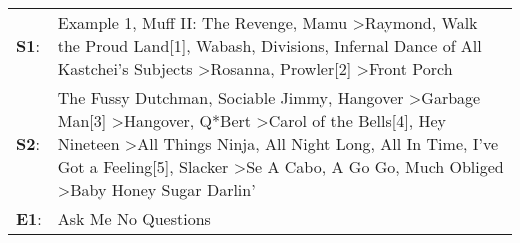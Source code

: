 \begin{supertabular}{p{0.03\textwidth}p{0.92\textwidth}}
 \textbf{S1}:  &                                                                                                                                                                                                                                                                                                Example 1\textsuperscript{}, \enspace Muff II: The Revenge\textsuperscript{}, \enspace Mamu\textsuperscript{} \textgreater \enspace Raymond\textsuperscript{}, \enspace Walk the Proud Land[1]\textsuperscript{}, \enspace Wabash\textsuperscript{}, \enspace Divisions\textsuperscript{}, \enspace Infernal Dance of All Kastchei's Subjects\textsuperscript{} \textgreater \enspace Rosanna\textsuperscript{}, \enspace Prowler[2]\textsuperscript{} \textgreater \enspace Front Porch\textsuperscript{}  \enspace  \\
 \textbf{S2}:  &  The Fussy Dutchman\textsuperscript{}, \enspace Sociable Jimmy\textsuperscript{}, \enspace Hangover\textsuperscript{} \textgreater \enspace Garbage Man[3]\textsuperscript{} \textgreater \enspace Hangover\textsuperscript{}, \enspace Q*Bert\textsuperscript{} \textgreater \enspace Carol of the Bells[4]\textsuperscript{}, \enspace Hey Nineteen\textsuperscript{} \textgreater \enspace All Things Ninja\textsuperscript{}, \enspace All Night Long\textsuperscript{}, \enspace All In Time\textsuperscript{}, \enspace I've Got a Feeling[5]\textsuperscript{}, \enspace Slacker\textsuperscript{} \textgreater \enspace Se A Cabo\textsuperscript{}, \enspace A Go Go\textsuperscript{}, \enspace Much Obliged\textsuperscript{} \textgreater \enspace Baby Honey Sugar Darlin'\textsuperscript{}  \enspace  \\
 \textbf{E1}:  &                                                                                                                                                                                                                                                                                                                                                                                                                                                                                                                                                                                                                                                                                                                                                                     Ask Me No Questions\textsuperscript{}  \enspace  \\
\end{supertabular}
